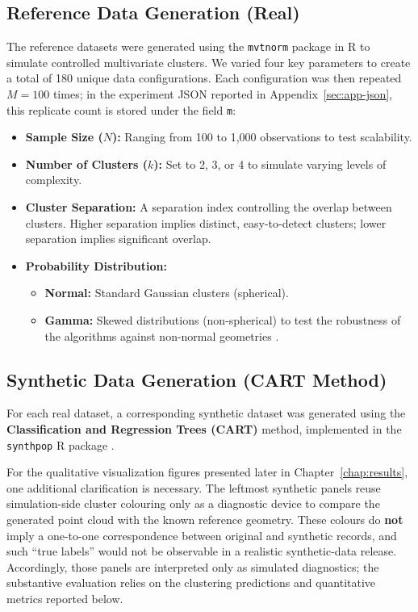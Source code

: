 \subsection{Reference Data Generation (Real)}
The reference datasets were generated using the \texttt{mvtnorm} package in R \cite{mvtnormmanual, genzbretz2009} to simulate controlled multivariate clusters. We varied four key parameters to create a total of 180 unique data configurations. Each configuration was then repeated $M = 100$ times; in the experiment JSON reported in Appendix~\ref{sec:app-json}, this replicate count is stored under the field \texttt{m}:
\begin{itemize}
  \item \textbf{Sample Size ($N$):} Ranging from 100 to 1,000 observations to test scalability.
  \item \textbf{Number of Clusters ($k$):} Set to 2, 3, or 4 to simulate varying levels of complexity.
  \item \textbf{Cluster Separation:} A separation index controlling the overlap between clusters. Higher separation implies distinct, easy-to-detect clusters; lower separation implies significant overlap.
  \item \textbf{Probability Distribution:}
  \begin{itemize}
    \item \textbf{Normal:} Standard Gaussian clusters (spherical).
    \item \textbf{Gamma:} Skewed distributions (non-spherical) to test the robustness of the algorithms against non-normal geometries \cite{yan2007}.
  \end{itemize}
\end{itemize}

\subsection{Synthetic Data Generation (CART Method)}
For each real dataset, a corresponding synthetic dataset was generated using the \textbf{Classification and Regression Trees (CART)} method, implemented in the \texttt{synthpop} R package \cite{nowok2016}.

For the qualitative visualization figures presented later in Chapter~\ref{chap:results}, one additional clarification is necessary. The leftmost synthetic panels reuse simulation-side cluster colouring only as a diagnostic device to compare the generated point cloud with the known reference geometry. These colours do \textbf{not} imply a one-to-one correspondence between original and synthetic records, and such ``true labels'' would not be observable in a realistic synthetic-data release. Accordingly, those panels are interpreted only as simulated diagnostics; the substantive evaluation relies on the clustering predictions and quantitative metrics reported below.


